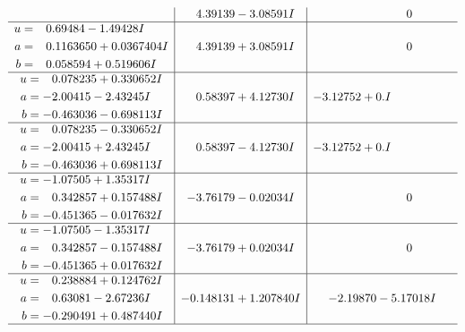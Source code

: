\documentclass[1p]{elsarticle_modified}
\theoremstyle{definition}
\begin{document}
$$\begin{array}{c|c|c}
 & \phantom{-}4.39139 - 3.08591 I & \phantom{-0.000000 } 0 \\ \hline\begin{aligned}
u &= \phantom{-}0.69484 - 1.49428 I \\
a &= \phantom{-}0.1163650 + 0.0367404 I \\
b &= \phantom{-}0.058594 + 0.519606 I\end{aligned}
 & \phantom{-}4.39139 + 3.08591 I & \phantom{-0.000000 } 0 \\ \hline\begin{aligned}
u &= \phantom{-}0.078235 + 0.330652 I \\
a &= -2.00415 - 2.43245 I \\
b &= -0.463036 - 0.698113 I\end{aligned}
 & \phantom{-}0.58397 + 4.12730 I & -3.12752 + 0. I\phantom{ +0.000000I} \\ \hline\begin{aligned}
u &= \phantom{-}0.078235 - 0.330652 I \\
a &= -2.00415 + 2.43245 I \\
b &= -0.463036 + 0.698113 I\end{aligned}
 & \phantom{-}0.58397 - 4.12730 I & -3.12752 + 0. I\phantom{ +0.000000I} \\ \hline\begin{aligned}
u &= -1.07505 + 1.35317 I \\
a &= \phantom{-}0.342857 + 0.157488 I \\
b &= -0.451365 - 0.017632 I\end{aligned}
 & -3.76179 - 0.02034 I & \phantom{-0.000000 } 0 \\ \hline\begin{aligned}
u &= -1.07505 - 1.35317 I \\
a &= \phantom{-}0.342857 - 0.157488 I \\
b &= -0.451365 + 0.017632 I\end{aligned}
 & -3.76179 + 0.02034 I & \phantom{-0.000000 } 0 \\ \hline\begin{aligned}
u &= \phantom{-}0.238884 + 0.124762 I \\
a &= \phantom{-}0.63081 - 2.67236 I \\
b &= -0.290491 + 0.487440 I\end{aligned}
 & -0.148131 + 1.207840 I & -2.19870 - 5.17018 I\\
 \hline 
 \end{array}$$\newpage$$\begin{array}{c|c|c}  

\end{array}$$
\end{document}
